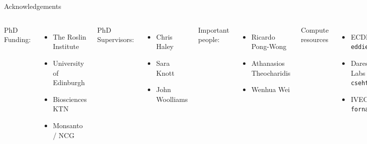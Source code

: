\documentclass{beamer}
\begin{document}
\section*{}

\begin{frame}{Acknowledgements}


\begin{columns}[c]


{\tiny
PhD Funding:
\begin{itemize}
\item The Roslin Institute
\item University of Edinburgh
\item Biosciences KTN
\item Monsanto / NCG
\end{itemize}
PhD Supervisors:
\begin{itemize}
\item Chris Haley
\item Sara Knott
\item John Woolliams
\end{itemize}
Important people:
\begin{itemize}
\item Ricardo Pong-Wong
\item Athanasios Theocharidis
\item Wenhua Wei
\end{itemize}
Compute resources
\begin{itemize}
\item ECDF - {\tt eddie}
\item Daresbury Labs - {\tt cseht}
\item IVEC - {\tt fornax}
\end{itemize}
}


{\tiny
Complex Trait Genomics Group

\begin{itemize}
\item Peter Visscher
\item Naomi Wray
\item \textbf{Joseph Powell}
\item Jian Yang
\item Allan Mcrae
\item Anita Goldinger
\item Hong Lee
\item Anna Vinkhuyzen
\item Guo-Bo Chen
\item Beben Benyamin
\item Zong Zhang
\item Enda Byrne
\item Marie-Jo Brion
\item Sven Stringer
\end{itemize}
}

\end{columns}
\end{frame}
\end{document}

